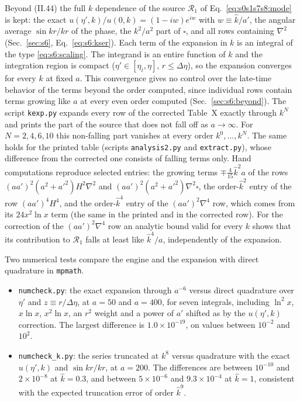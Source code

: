 \documentclass[aps,prd,onecolumn,10pt,nofootinbib,floatfix]{revtex4-2}
\newcommand{\eqII}[1]{(II.#1)}
\begin{document}
Beyond \eqII{44} the full $k$ dependence of the source $\mathcal R_1$ of Eq.~\eqref{eq:s0s1s7s8:mode} is kept: the exact
$u(\eta',k)/u(0,k)=(1-iw)e^{iw}$ with $w\equiv\hat k/a'$, the angular average $\sin kr/kr$ of the phase, the $k^2/a^2$ part of
$\square$, and all rows containing $\nabla^2$ (Sec.~\ref{sec:s6}, Eq.~\eqref{eq:s6:kser}). Each term of the
expansion in $k$ is an integral of the type \eqref{eq:s6:scaling}. The integrand is an entire function of $k$ and the
integration region is compact ($\eta'\in[\eta_i,\eta]$, $r\le\Delta\eta$), so the expansion converges for every $k$ at fixed $a$. This
convergence gives no control over the late-time behavior of the terms beyond the order computed, since individual rows contain terms
growing like $a$ at every even order computed (Sec.~\ref{sec:s6:beyond}). The
script \texttt{kexp.py} expands every row of the corrected Table~X exactly through $k^N$ and prints the part of the source that does
not fall off as $a\to\infty$. For $N=2,4,6,10$ this non-falling part vanishes at every order $k^0,\dots,k^N$. The same holds for the
printed table (scripts \texttt{analysis2.py} and \texttt{extract.py}), whose difference from the corrected one consists of falling
terms only. Hand computations reproduce selected entries: the growing terms $\mp\tfrac{4}{15}\hat k^2a$ of the rows
$(aa')^2(a^2+a'^2)H^2\nabla^2$ and $(aa')^2(a^2+a'^2)\nabla^2\square$, the order-$\hat k^2$ entry of the row $(aa')^4H^4$, and the
order-$\hat k^4$ entry of the $(aa')^2\nabla^4$ row, which comes from its $24x^2\ln x$ term (the same in the printed and in the
corrected row). For the correction of the
$(aa')^2\nabla^4$ row an analytic bound valid for every $k$ shows that its contribution to $\mathcal R_1$ falls at least like
$\hat k^4/a$, independently of the expansion.

Two numerical tests compare the engine and the expansion with direct quadrature in \texttt{mpmath}.
\begin{itemize}
\item \texttt{numcheck.py}: the exact expansion through $a^{-6}$ versus direct quadrature over $\eta'$ and $z\equiv r/\Delta\eta$, at
$a=50$ and $a=400$, for seven integrals, including $\ln^2x$, $x\ln x$, $x^2\ln x$, an $r^2$ weight and a power of $a'$ shifted as by
the $u(\eta',k)$ correction. The largest difference is $1.0\times10^{-19}$, on values between $10^{-2}$ and $10^2$.
\item \texttt{numcheck\_k.py}: the series truncated at $k^8$ versus quadrature with the exact $u(\eta',k)$ and $\sin kr/kr$, at $a=200$.
The differences are between $10^{-10}$ and $2\times10^{-8}$ at $\hat k=0.3$, and between $5\times10^{-6}$ and $9.3\times10^{-4}$ at
$\hat k=1$, consistent with the expected truncation error of order $\hat k^9$.
\end{itemize}
\end{document}
